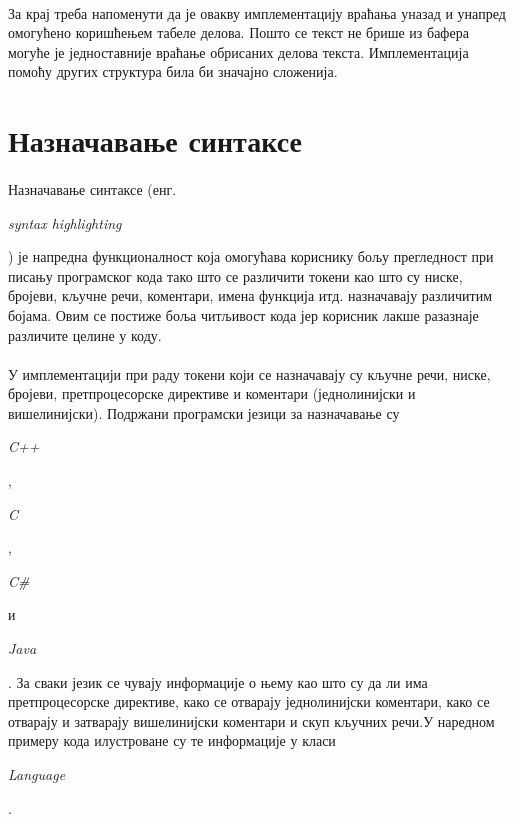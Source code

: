 \documentclass[12pt,oneside]{memoir}
\begin{document}
\paragraph{}
За крај треба напоменути да је овакву имплементацију враћања уназад и унапред
омогућено коришћењем табеле делова. Пошто се текст не брише из бафера могуће
је једноставније враћање обрисаних делова текста. Имплементација помоћу других
структура била би значајно сложенија.

\section{Назначавање синтаксе}

\paragraph{}
Назначавање синтаксе (енг. \begin{latinica}\textit{syntax highlighting}\end{latinica})
је напредна функционалност која омогућава кориснику бољу прегледност при писању
програмског кода тако што се различити токени као што су ниске, бројеви, кључне речи, коментари, имена функција итд. назначавају различитим бојама.  Овим се постиже боља читљивост кода јер корисник лакше разазнаје различите целине у коду.

\paragraph{}
У имплементацији при раду токени који се назначавају су кључне речи, ниске, бројеви, претпроцесорске директиве и коментари (једнолинијски и вишелинијски).
Подржани програмски језици за назначавање су
\begin{latinica}\textit{C++}\end{latinica}, \begin{latinica}\textit{C}\end{latinica},
\begin{latinica}\textit{C\#}\end{latinica} и \begin{latinica}\textit{Java}\end{latinica}. За сваки језик се чувају
информације о њему као што су да ли има претпроцесорске директиве, како
се отварају једнолинијски коментари, како се отварају и затварају вишелинијски
коментари и скуп кључних речи.У наредном примеру кода илустроване су те
информације у класи \begin{latinica}\textit{Language}\end{latinica}.
\end{document}
